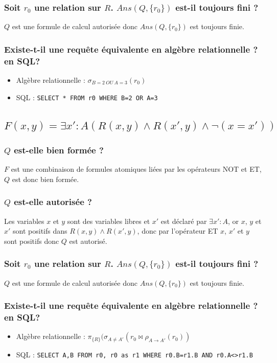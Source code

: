 \documentclass[10pt,a4paper,twoside]{article}
\begin{document}
\subsubsection{Soit $r_{0}$ une relation sur $R$. $Ans(Q,\{r_{0}\})$ est-il toujours fini ?}
$Q$ est une formule de calcul autorisée donc $Ans(Q,\{r_{0}\})$ est toujours finie.

\subsubsection{Existe-t-il une requête équivalente en algèbre relationnelle ? en SQL?}
\begin{itemize}
\item Algèbre relationnelle : $\sigma_{B=2\ OU\ A=3}(r_{0})$
\item SQL : \verb[SELECT * FROM r0 WHERE B=2 OR A=3[
\end{itemize}

\subsection{$F(x,y) = \exists x' : A(R(x,y)\wedge R(x',y) \wedge \neg(x=x')) $}
\subsubsection{$Q$ est-elle bien formée ?}
$F$ est une combinaison de formules atomiques liées par les opérateurs NOT et ET, $Q$ est donc bien formée.

\subsubsection{$Q$ est-elle autorisée ?}
Les variables $x$ et $y$ sont des variables libres et $x'$ est déclaré par $\exists x' :A$, or $x$, $y$ et $x'$  sont positifs dans $R(x,y) \wedge R(x',y)$, donc par l'opérateur ET $x$, $x'$ et $y$ sont positifs donc $Q$ est autorisé.

\subsubsection{Soit $r_{0}$ une relation sur $R$. $Ans(Q,\{r_{0}\})$ est-il toujours fini ?}
$Q$ est une formule de calcul autorisée donc $Ans(Q,\{r_{0}\})$ est toujours finie.

\subsubsection{Existe-t-il une requête équivalente en algèbre relationnelle ? en SQL?}
\begin{itemize}
\item Algèbre relationnelle : $\pi_{\{R\}}(\sigma_{A\neq A'}(r_{0} \bowtie \rho_{A\rightarrow A'}(r_{0}))$
\item SQL : \verb[SELECT A,B FROM r0, r0 as r1 WHERE r0.B=r1.B AND r0.A<>r1.B[
\end{itemize}
\end{document}
